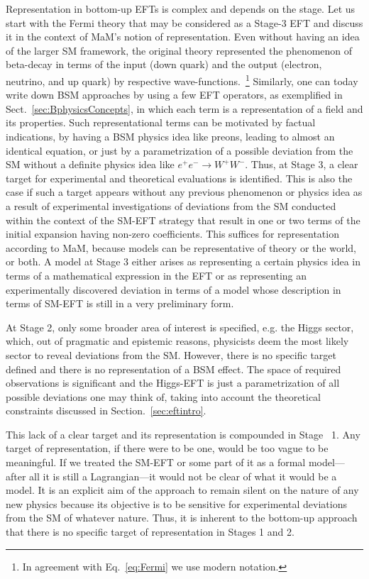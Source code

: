 Representation in bottom-up EFTs is complex and depends on the stage.
Let us start with the Fermi theory that may be considered as a Stage-3 EFT and discuss it in the context of MaM's notion of representation. 
Even without having an idea of the larger SM framework, the original theory represented the phenomenon of beta-decay in terms of the input (down quark) and the output (electron, neutrino, and up quark) by respective wave-functions.~\footnote{In agreement with Eq.~\ref{eq:Fermi} we use modern notation.}
Similarly, one can today write down BSM approaches by using a few EFT operators, as exemplified in Sect.~\ref{sec:BphysicsConcepts}, in which each term is a representation of a field and its properties.
Such representational terms can be motivated by factual indications, by having a BSM physics idea like preons, leading to almost an identical equation, or just by a parametrization of a possible deviation from the SM without a definite physics idea like $e^+e^-\rightarrow W^+W^-$.
Thus, at Stage 3, a clear target for experimental and theoretical evaluations is identified.
This is also the case if such a target appears without any previous phenomenon or physics idea as a result of experimental investigations of deviations from the SM conducted within the context of the SM-EFT strategy that result in one or two terms of the initial expansion having non-zero coefficients.
This suffices for representation according to MaM, because models can be representative of theory or the world, or both. A model at Stage 3 either arises as representing a certain physics idea in terms of a mathematical expression in the EFT or as representing an experimentally discovered deviation in terms of a model whose description in terms of SM-EFT is still in a very preliminary form.

At Stage 2, only some broader area of interest is specified, e.g. the Higgs sector, which, 
out of pragmatic and epistemic reasons, physicists deem the most likely sector to reveal deviations from the SM.
However, there is no specific target defined and there is no representation of a BSM effect.
The space of required observations is significant and the Higgs-EFT is just a parametrization of all possible deviations one may think of, taking into account the theoretical constraints discussed in Section.~\ref{sec:eftintro}. 

This lack of a clear target and its representation is compounded in Stage~ 1. Any target of representation, if there were to be one, would be too vague to be meaningful. 
If we treated the SM-EFT or some part of it as a formal model---after all it is still a Lagrangian---it would not be clear of what it would be a model.
It is an explicit aim of the approach to remain silent on the nature of any new physics because its objective is to be sensitive for experimental deviations from the SM of whatever nature. 
Thus, it is inherent to the bottom-up approach that there is no specific target of representation in Stages 1 and 2.

